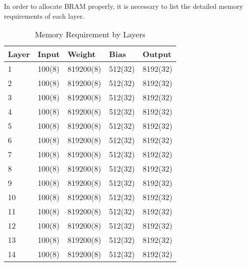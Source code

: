 In order to allocate BRAM properly, it is necessary to list the detailed memory requirements of each layer.

\begin{table}[h]
  \centering
  \caption{Memory Requirement by Layers}
  \begin{tabular}{l | l | l | l | l}
    \toprule
    Layer & Input & Weight & Bias & Output \\
    \midrule
    1 & 100(8) & 819200(8) & 512(32) & 8192(32) \\
    2 & 100(8) & 819200(8) & 512(32) & 8192(32) \\
    3 & 100(8) & 819200(8) & 512(32) & 8192(32) \\
    4 & 100(8) & 819200(8) & 512(32) & 8192(32) \\
    5 & 100(8) & 819200(8) & 512(32) & 8192(32) \\
    6 & 100(8) & 819200(8) & 512(32) & 8192(32) \\
    7 & 100(8) & 819200(8) & 512(32) & 8192(32) \\
    8 & 100(8) & 819200(8) & 512(32) & 8192(32) \\
    9 & 100(8) & 819200(8) & 512(32) & 8192(32) \\
    10 & 100(8) & 819200(8) & 512(32) & 8192(32) \\
    11 & 100(8) & 819200(8) & 512(32) & 8192(32) \\
    12 & 100(8) & 819200(8) & 512(32) & 8192(32) \\
    13 & 100(8) & 819200(8) & 512(32) & 8192(32) \\
    14 & 100(8) & 819200(8) & 512(32) & 8192(32)
    \bottomrule
  \end{tabular}
  \label{table:memory_requirements}
\end{table}

\clearpage %

